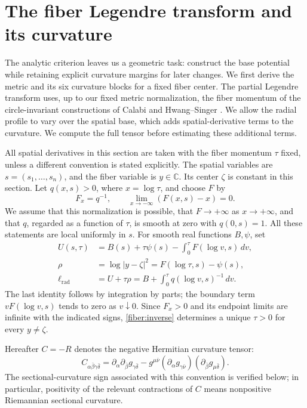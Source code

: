 \section{The fiber Legendre transform and its curvature}\label{sec:fiber}

The analytic criterion leaves us a geometric task: construct the base
potential while retaining explicit curvature margins for later changes.
We first derive the metric and its six curvature blocks for a fixed fiber
center. The partial Legendre transform uses, up to our fixed metric
normalization, the fiber momentum of the circle-invariant constructions
of Calabi and Hwang--Singer \citep{Calabi1979,HwangSinger2002}.
We allow the radial profile to vary over the spatial base, which adds
spatial-derivative terms to the curvature. We compute the full tensor
before estimating these additional terms.

All spatial derivatives in this section are taken with the fiber momentum
\(\tau\) fixed, unless a different convention is stated explicitly.
The spatial variables are \(s=(s_1,\ldots,s_n)\), and the fiber variable is
\(y\in\mathbb C\).  Its center \(\zeta\) is constant in this section.
Let \(q(x,s)>0\), where \(x=\log\tau\), and choose \(F\) by
\begin{equation}\label{fiber:F}
 F_x=q^{-1},\qquad \lim_{x\to-\infty}(F(x,s)-x)=0.
\end{equation}
We assume that this normalization is possible, that \(F\to+\infty\)
as \(x\to+\infty\), and that \(q\), regarded as a function of \(\tau\),
is smooth at zero with \(q(0,s)=1\).  All these statements are local
uniformly in \(s\).  For smooth real functions \(B,\psi\), set
\begin{align}
 U(s,\tau)&=B(s)+\tau\psi(s)-\int_0^\tau F(\log v,s)\,dv,
 \label{fiber:U}\\
 \rho&=\log|y-\zeta|^2=F(\log\tau,s)-\psi(s),
 \label{fiber:inverse}\\
 \ell_{\mathrm{rad}}&=U+\tau\rho
 =B+\int_0^\tau q(\log v,s)^{-1}\,dv.
 \label{fiber:potential}
\end{align}
The last identity follows by integration by parts; the boundary term
\(vF(\log v,s)\) tends to zero as \(v\downarrow0\).
Since \(F_x>0\) and its endpoint limits are infinite with the indicated
signs, \eqref{fiber:inverse} determines a unique \(\tau>0\) for every
\(y\ne\zeta\).

Hereafter \(C=-R\) denotes the negative Hermitian curvature tensor:
\begin{equation}\label{fiber:curvature-convention}
 C_{\alpha\bar\beta\gamma\bar\delta}
 =\partial_\alpha\partial_{\bar\beta}g_{\gamma\bar\delta}
 -g^{\mu\bar\nu}
   (\partial_\alpha g_{\gamma\bar\nu})
   (\partial_{\bar\beta}g_{\mu\bar\delta}).
\end{equation}
The sectional-curvature sign associated with this convention is verified
below; in particular, positivity of the relevant contractions of \(C\)
means nonpositive Riemannian sectional curvature.

